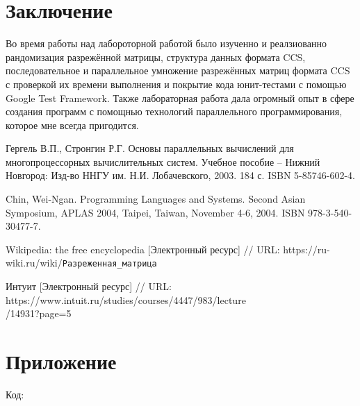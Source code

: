 \documentclass[14pt,a4paper,report]{ncc}
\begin{document}
\section*{Заключение}
Во время работы над лабороторной работой было изученно и реалзиованно рандомизация разрежённой матрицы, структура данных формата CCS, последовательное и параллельное умножение разрежённых матриц формата CCS с проверкой их времени выполнения и покрытие кода юнит-тестами с помощью Google Test Framework. Также лабораторная работа дала огромный опыт в сфере создания программ с помощнью технологий параллельного программирования, которое мне всегда пригодится.

\newpage

\begin{thebibliography}{1}
	 Гергель В.П., Стронгин Р.Г. Основы параллельных вычислений для многопроцессорных вычислительных систем. Учебное пособие – Нижний Новгород: Изд-во ННГУ им. Н.И. Лобачевского, 2003. 184 с. ISBN 5-85746-602-4.
	
	 Chin, Wei-Ngan. Programming Languages and Systems. Second Asian Symposium, APLAS 2004, Taipei, Taiwan, November 4-6, 2004. ISBN 978-3-540-30477-7.
	
	 Wikipedia: the free encyclopedia [Электронный ресурс] // URL: https://ru-wiki.ru/wiki/\verb|Разреженная_матрица| 
	
	 Интуит [Электронный ресурс] // URL:  https://www.intuit.ru/studies/courses/4447/983/lecture\\/14931?page=5 
\end{thebibliography}
\newpage

\section*{Приложение}

Код:

%
%
%

%
%
%
\end{document}
